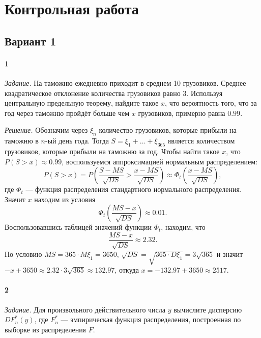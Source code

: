\chapter*{Контрольная работа}

\section*{Вариант 1}

\subsubsection*{1}

\textit{Задание.} На таможню ежедневно приходит в среднем 10 грузовиков.
Среднее квадратическое отклонение количества грузовиков равно 3.
Используя центральную предельную теорему, найдите такое $x$, что вероятность того,
что за год через таможню пройдёт больше чем $x$ грузовиков, примерно равна $0.99$.

\textit{Решение.}
Обозначим через $ \xi_n$ количество грузовиков, которые прибыли на таможню в $n$-ый день года.
Тогда $S = \xi_1 + \dotsc + \xi_{365}$ является количеством грузовиков,
которые прибыли на таможню за год.
Чтобы найти такое $x$, что $P \left( S > x \right) \approx 0.99$,
воспользуемся аппроксимацией нормальным распределением:
$$P \left( S > x \right) =
  P \left( \frac{S - MS}{ \sqrt{DS}} > \frac{x - MS}{ \sqrt{DS}} \right) \approx
  \Phi_t \left( \frac{x - MS}{ \sqrt{DS}} \right),$$
где $ \Phi_t$ --- функция распределения стандартного нормального распределения.
Значит $x$ находим из условия
$$ \Phi_t \left( \frac{MS - x}{ \sqrt{DS}} \right) \approx
  0.01.$$
Воспользовавшись таблицей значений функции $ \Phi_t$, находим, что
$$ \frac{MS - x}{ \sqrt{DS}} \approx
  2.32.$$
По условию $MS = 365 \cdot M \xi_1 = 3650, \, \sqrt{DS} = \sqrt{365 \cdot D \xi_1} = 3 \sqrt{365}$
и значит $-x + 3650 \approx 2.32 \cdot 3 \sqrt{365} \approx 132.97$,
откуда $x = -132.97 + 3650 \approx 2517$.

\subsubsection*{2}

\textit{Задание.}
Для произвольного действительного числа $y$ вычислите дисперсию $DF_n^* \left( y \right) $,
где $F_n^*$ --- эмпирическая функция распределения, построенная по выборке из распределения $F$.

